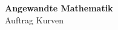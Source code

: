 \documentclass[12pt, a4paper, twoside]{article}
\begin{document}
\begin{titlepage}
  \begin{center}
    \vspace*{5cm}
    \huge\textbf{Angewandte Mathematik}\\
    \vspace{0.5cm}
    Auftrag Kurven\\
    \date\\
    \vspace{2cm}
  \end{center}
\end{titlepage}
\end{document}

